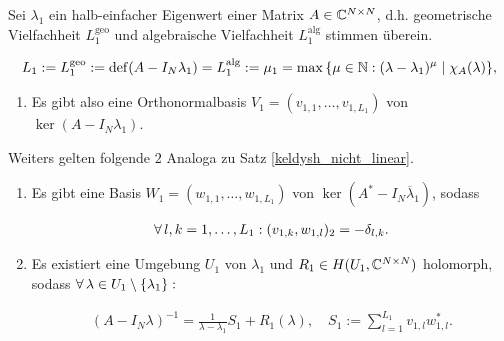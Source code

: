 \begin{theorem} \label{keldysh_linear}

    Sei $\lambda_1$ ein halb-einfacher Eigenwert einer Matrix $A \in \mathbb{C}^{N \times N}$, d.h. geometrische Vielfachheit $L_1^\mathrm{geo}$ und algebraische Vielfachheit $L_1^\mathrm{alg}$ stimmen überein.

    \begin{align*}
        L_1
        :=
        L_1^\mathrm{geo} := \operatorname{def}(A - I_N \lambda_1)
        =
        L_1^\mathrm{alg} := \mu_1 = \max {\left \{ \mu \in \mathbb{N}: (\lambda - \lambda_1)^\mu \mid \chi_A(\lambda) \right \}},
    \end{align*}

    \begin{enumerate}[label = (\roman*)]
        \item Es gibt also eine Orthonormalbasis $V_1 = (v_{1, 1}, \dots, v_{1, L_1})$ von $\ker (A - I_N \lambda_1)$.
    \end{enumerate}

    Weiters gelten folgende $2$ Analoga zu Satz \ref{keldysh_nicht_linear}.

    \begin{enumerate}[label = (\roman*), start = 2]

        \item Es gibt eine Basis $W_1 = (w_{1, 1}, \dots, w_{1, L_1})$ von $\ker (A^\ast - I_N \overline \lambda_1)$, sodass

        \begin{align*}
            \forall \, l, k = 1, \dots, L_1:
            (v_{1, k}, w_{1, l})_2 = -\delta_{l, k}.
        \end{align*}

        \item Es existiert eine Umgebung $U_1$ von $\lambda_1$ und $R_1 \in H(U_1, \mathbb{C}^{N \times N})$ holomorph, sodass $\forall \, \lambda \in U_1 \setminus {\left \{ \lambda_1 \right \}}:$

        \begin{align*}
            (A - I_N \lambda)^{-1}
            =
            \frac{1}{\lambda - \lambda_1} S_1
            +
            R_1(\lambda),
            \quad
            S_1
            :=
            \sum_{l=1}^{L_1}
                v_{1, l} w_{1, l}^\ast.
        \end{align*}

    \end{enumerate}

\end{theorem}
